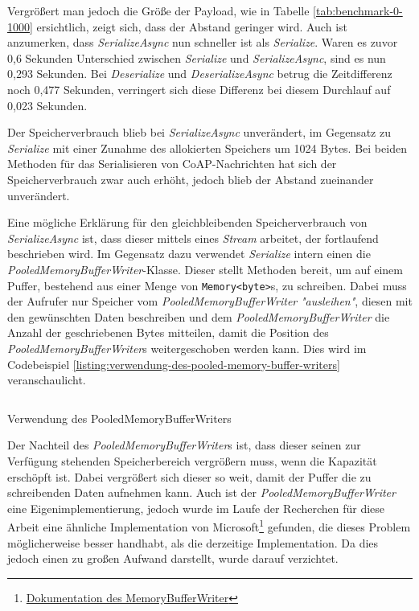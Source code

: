 Vergrößert man jedoch die Größe der Payload, wie in Tabelle \ref{tab:benchmark-0-1000} ersichtlich, zeigt sich, dass der Abstand geringer wird. Auch ist anzumerken, dass \textit{SerializeAsync} nun schneller ist als \textit{Serialize}. Waren es zuvor 0,6 Sekunden Unterschied zwischen \textit{Serialize} und \textit{SerializeAsync}, sind es nun 0,293 Sekunden. Bei \textit{Deserialize} und \textit{DeserializeAsync} betrug die Zeitdifferenz noch 0,477 Sekunden, verringert sich diese Differenz bei diesem Durchlauf auf 0,023 Sekunden.

Der Speicherverbrauch blieb bei \textit{SerializeAsync} unverändert, im Gegensatz zu \textit{Serialize} mit einer Zunahme des allokierten Speichers um 1024 Bytes. Bei beiden Methoden für das Serialisieren von CoAP-Nachrichten hat sich der Speicherverbrauch zwar auch erhöht, jedoch blieb der Abstand zueinander unverändert.

Eine mögliche Erklärung für den gleichbleibenden Speicherverbrauch von \textit{SerializeAsync} ist, dass dieser mittels eines \textit{Stream} arbeitet, der fortlaufend beschrieben wird. Im Gegensatz dazu verwendet \textit{Serialize} intern einen die \textit{PooledMemoryBufferWriter}-Klasse. Dieser stellt Methoden bereit, um auf einem Puffer, bestehend aus einer Menge von \texttt{Memory<byte>}s, zu schreiben. Dabei muss der Aufrufer nur Speicher vom \textit{PooledMemoryBufferWriter} \textit{"ausleihen"}, diesen mit den gewünschten Daten beschreiben und dem \textit{PooledMemoryBufferWriter} die Anzahl der geschriebenen Bytes mitteilen, damit die Position des \textit{PooledMemoryBufferWriter}s weitergeschoben werden kann. Dies wird im Codebeispiel \ref{listing:verwendung-des-pooled-memory-buffer-writers} veranschaulicht.

\begin{listing}[h]
    \inputminted[framesep=2mm, baselinestretch=1.2, fontsize=\normalsize, linenos]{csharp}{codes/pooled_memory_buffer_writer_example.cs}
    \caption{Verwendung des PooledMemoryBufferWriters}
    \label{listing:verwendung-des-pooled-memory-buffer-writers}
\end{listing}

Der Nachteil des \textit{PooledMemoryBufferWriter}s ist, dass dieser seinen zur Verfügung stehenden Speicherbereich vergrößern muss, wenn die Kapazität erschöpft ist. Dabei vergrößert sich dieser so weit, damit der Puffer die zu schreibenden Daten aufnehmen kann. Auch ist der \textit{PooledMemoryBufferWriter} eine Eigenimplementierung, jedoch wurde im Laufe der Recherchen für diese Arbeit eine ähnliche Implementation von Microsoft\footnote{\href{https://docs.microsoft.com/en-us/dotnet/api/microsoft.toolkit.highperformance.buffers.memorybufferwriter-1?view=win-comm-toolkit-dotnet-7.0}{Dokumentation des MemoryBufferWriter}} gefunden, die dieses Problem möglicherweise besser handhabt, als die derzeitige Implementation. Da dies jedoch einen zu großen Aufwand darstellt, wurde darauf verzichtet.

